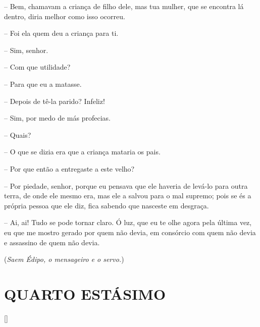  --   Bem, chamavam a criança de filho dele, mas tua mulher, que se encontra
lá dentro, diria melhor como isso ocorreu.

 --   Foi ela quem deu a criança para ti.

 --   Sim, senhor.

 --   Com que utilidade?

 --   Para que eu a matasse.

 --   Depois de tê-la parido? Infeliz!

 --   Sim, por medo de más profecias.

 --   Quais?

 --   O que se dizia era que a criança mataria os pais.

 --   Por que então a entregaste a este velho?

 --   Por piedade, senhor, porque eu pensava que ele haveria de levá-lo para
outra  terra, de onde ele mesmo era, mas ele a salvou para o mal
supremo; pois se és a própria pessoa que ele diz, fica sabendo que
nasceste em desgraça.

 --   Ai, ai! Tudo se pode tornar claro. Ó luz, que eu te olhe agora pela
última vez, eu que me mostro gerado por quem não devia, em consórcio com
quem não devia e assassino de quem não devia.

(\emph{Saem Édipo, o mensageiro e o servo.})

\section{QUARTO ESTÁSIMO}


\hfill [] 

